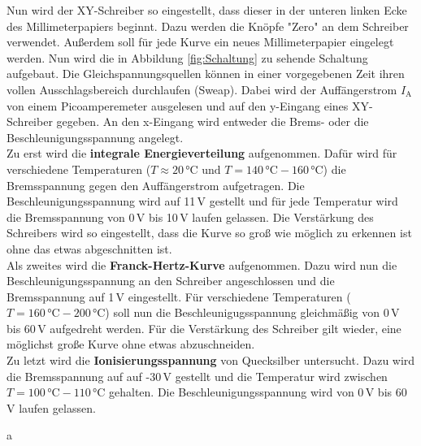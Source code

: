 Nun wird der XY-Schreiber so eingestellt, dass dieser in der unteren linken Ecke des Millimeterpapiers beginnt. Dazu werden die Knöpfe "Zero" an dem Schreiber verwendet. Außerdem soll für jede Kurve ein neues Millimeterpapier eingelegt werden. Nun wird die in Abbildung \eqref{fig:Schaltung} zu sehende Schaltung aufgebaut. Die Gleichspannungsquellen können in einer vorgegebenen Zeit ihren vollen Ausschlagsbereich durchlaufen (Sweap). Dabei wird der Auffängerstrom $I_\text{A}$ von einem Picoamperemeter ausgelesen und auf den y-Eingang eines XY-Schreiber gegeben. An den x-Eingang wird entweder die Brems- oder die Beschleunigungsspannung angelegt. \\
Zu erst wird die \textbf{integrale Energieverteilung} aufgenommen. Dafür wird für verschiedene Temperaturen ($T \approx 20\,\text{°C und } T = 140\,\text{°C} - 160\,\text{°C}$) die Bremsspannung gegen den Auffängerstrom aufgetragen. Die Beschleunigungsspannung wird auf 11\,V gestellt und für jede Temperatur wird die Bremsspannung von 0\,V bis 10\,V laufen gelassen. Die Verstärkung des Schreibers wird so eingestellt, dass die Kurve so groß wie möglich zu erkennen ist ohne das etwas abgeschnitten ist. \\
Als zweites wird die \textbf{Franck-Hertz-Kurve} aufgenommen. Dazu wird nun die Beschleunigungsspannung an den Schreiber angeschlossen und die Bremsspannung auf 1\,V eingestellt. Für verschiedene Temperaturen ($T = 160\,\text{°C} - 200\,\text{°C}$) soll nun die Beschleunigugsspannung gleichmäßig von 0\,V bis 60\,V aufgedreht werden. Für die Verstärkung des Schreiber gilt wieder, eine möglichst große Kurve ohne etwas abzuschneiden. \\
Zu letzt wird die \textbf{Ionisierungsspannung} von Quecksilber untersucht. Dazu wird die Bremsspannung auf auf -30\,V gestellt und die Temperatur wird zwischen $T = 100\,\text{°C} - 110\,\text{°C}$ gehalten. Die Beschleunigungsspannung wird von 0\,V bis 60\,V laufen gelassen.



























a
